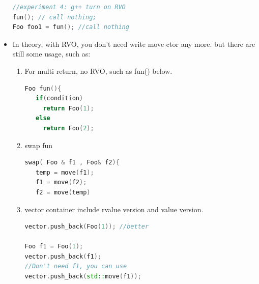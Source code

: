 \documentclass[a4paper,12pt,twoside]{book}
\begin{document}
\begin{itemize}
\begin{lstlisting}[frame=single, language=c++]
//experiment 4: g++ turn on RVO
fun(); // call nothing;
Foo foo1 = fun(); //call nothing
\end{lstlisting}


\item In theory, with RVO, you don't need write move ctor any more. but there are still some usage, such as:
\begin{enumerate}
\item For multi return, no RVO, such as fun() below.
\begin{lstlisting}[frame=single, language=c++]
Foo fun(){
   if(condition)
     return Foo(1);
   else
     return Foo(2);
\end{lstlisting}

\item swap fun
\begin{lstlisting}[frame=single, language=c++]
swap( Foo & f1 , Foo& f2){
   temp = move(f1);
   f1 = move(f2);
   f2 = move(temp)
\end{lstlisting}


\item vector container include rvalue version and value version.
\begin{lstlisting}[frame=single, language=c++]
vector.push_back(Foo(1)); //better

Foo f1 = Foo(1);
vector.push_back(f1);
//Don't need f1, you can use
vector.push_back(std::move(f1));
\end{lstlisting}
\end{enumerate}
\end{itemize}
\end{document}
